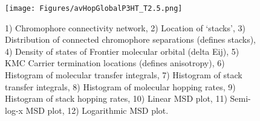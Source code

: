 \documentclass[12pt]{article}
\begin{document}
\begin{figure}[h]\centering
	\texttt{[image: Figures/avHopGlobalP3HT\_T2.5.png]}
    \caption{   1) Chromophore connectivity network, 
                2) Location of `stacks', 
                3) Distribution of connected chromophore separations (defines stacks),
                4) Density of states of Frontier molecular orbital (delta Eij),
                5) KMC Carrier termination locations (defines anisotropy),
                6) Histogram of molecular transfer integrals,
                7) Histogram of stack transfer integrals,
                8) Histogram of molecular hopping rates,
                9) Histogram of stack hopping rates,
                10) Linear MSD plot,
                11) Semi-log-x MSD plot,
                12) Logarithmic MSD plot.}
	\label{fig:avHopGlobalT2.5}
\end{figure}



\end{document}

